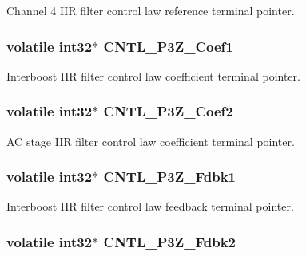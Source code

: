 Channel 4 I\-I\-R filter control law reference terminal pointer. \hypertarget{a00010_a41005c53e7c439f0af28e140f7d3d0ed}{
\subsubsection[{C\-N\-T\-L\-\_\-3\-P3\-Z\-\_\-\-Coef1}]{\setlength{\rightskip}{0pt plus 5cm}volatile int32$\ast$ C\-N\-T\-L\-\_\-P3\-Z\-\_\-\-Coef1}}\label{a00010_a41005c53e7c439f0af28e140f7d3d0ed}
Interboost I\-I\-R filter control law coefficient terminal pointer. \hypertarget{a00010_a7a74642d86ae9a823f58f49db57f8bc8}{
\subsubsection[{C\-N\-T\-L\-\_\-3\-P3\-Z\-\_\-\-Coef2}]{\setlength{\rightskip}{0pt plus 5cm}volatile int32$\ast$ C\-N\-T\-L\-\_\-P3\-Z\-\_\-\-Coef2}}\label{a00010_a7a74642d86ae9a823f58f49db57f8bc8}
A\-C stage I\-I\-R filter control law coefficient terminal pointer. \hypertarget{a00010_a361372a23d9146cd2d077e6c843ec47e}{
\subsubsection[{C\-N\-T\-L\-\_\-3\-P3\-Z\-\_\-\-Fdbk1}]{\setlength{\rightskip}{0pt plus 5cm}volatile int32$\ast$ C\-N\-T\-L\-\_\-P3\-Z\-\_\-\-Fdbk1}}\label{a00010_a361372a23d9146cd2d077e6c843ec47e}
Interboost I\-I\-R filter control law feedback terminal pointer. \hypertarget{a00010_a4676fa58f77cab7e1c4e86255049dfe7}{
\subsubsection[{C\-N\-T\-L\-\_\-3\-P3\-Z\-\_\-\-Fdbk2}]{\setlength{\rightskip}{0pt plus 5cm}volatile int32$\ast$ C\-N\-T\-L\-\_\-P3\-Z\-\_\-\-Fdbk2}}\label{a00010_a4676fa58f77cab7e1c4e86255049dfe7}

